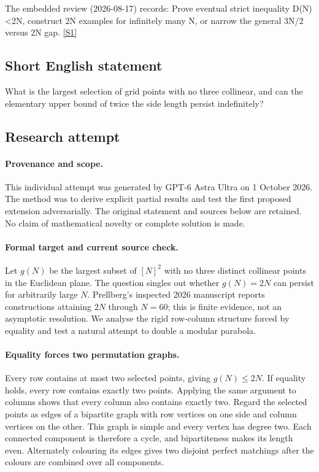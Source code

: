 \documentclass[11pt,a4paper]{article}
\newcommand{\sref}[2]{\hyperlink{source:#1:#2}{[S#2]}}
\begin{document}
The embedded review (2026-08-17) records: Prove eventual strict inequality D(N)<2N, construct 2N examples for infinitely many N, or narrow the general 3N/2 versus 2N gap. \sref{statement}{1}

\subsection{Short English statement}

What is the largest selection of grid points with no three collinear, and can the elementary upper bound of twice the side length persist indefinitely?

\subsection{Research attempt}

\paragraph{Provenance and scope.}
This individual attempt was generated by GPT-6 Astra Ultra on 1 October 2026. The method was to derive explicit partial results and test the first proposed extension adversarially. The original statement and sources below are retained. No claim of mathematical novelty or complete solution is made.

\paragraph{Formal target and current source check.}
Let $g(N)$ be the largest subset of $[N]^2$ with no three distinct collinear points in the Euclidean plane. The question singles out whether $g(N)=2N$ can persist for arbitrarily large $N$. Prellberg's inspected 2026 manuscript reports constructions attaining $2N$ through $N=60$; this is finite evidence, not an asymptotic resolution. We analyse the rigid row-column structure forced by equality and test a natural attempt to double a modular parabola.

\paragraph{Equality forces two permutation graphs.}
Every row contains at most two selected points, giving $g(N)\leq2N$. If equality holds, every row contains exactly two points. Applying the same argument to columns shows that every column also contains exactly two. Regard the selected points as edges of a bipartite graph with row vertices on one side and column vertices on the other. This graph is simple and every vertex has degree two. Each connected component is therefore a cycle, and bipartiteness makes its length even. Alternately colouring its edges gives two disjoint perfect matchings after the colours are combined over all components.
\end{document}
